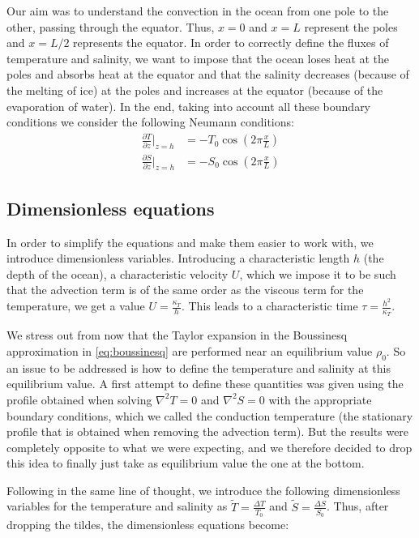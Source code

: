 \documentclass{article}
\begin{document}
Our aim was to understand the convection in the ocean from one pole to the other, passing through the equator. Thus, $x=0$ and $x=L$ represent the poles and $x=L/2$ represents the equator.
In order to correctly define the fluxes of temperature and salinity, we want to impose that the ocean loses heat at the poles and absorbs heat at the equator and that the salinity decreases (because of the melting of ice) at the poles and increases at the equator (because of the evaporation of water). In the end, taking into account all these boundary conditions we consider the following Neumann conditions:
\begin{equation}
  \begin{aligned}
    \frac{\partial T}{\partial z}\bigg|_{z = h} & = -T_0\cos(2\pi \frac{x}{L}) \\
    \frac{\partial S}{\partial z}\bigg|_{z = h} & = -S_0\cos(2\pi \frac{x}{L})
  \end{aligned}
\end{equation}


\subsection{Dimensionless equations}
In order to simplify the equations and make them easier to work with, we introduce dimensionless variables. Introducing a characteristic length $h$ (the depth of the ocean), a characteristic velocity $U$, which we impose it to be such that the advection term is of the same order as the viscous term for the temperature, we get a value $U=\frac{\kappa_T}{h}$. This leads to a characteristic time $\tau = \frac{h^2}{\kappa_T}$.

We stress out from now that the Taylor expansion in the Boussinesq approximation in \cref{eq:boussinesq} are performed near an equilibrium value $\rho_0$. So an issue to be addressed is how to define the temperature and salinity at this equilibrium value. A first attempt to define these quantities was given using the profile obtained when solving $\nabla^2T = 0$ and $\nabla^2S=0$ with the appropriate boundary conditions, which we called the conduction temperature (the stationary profile that is obtained when removing the advection term). But the results were completely opposite to what we were expecting, and we therefore decided to drop this idea to finally just take as equilibrium value the one at the bottom.

Following in the same line of thought, we introduce the following dimensionless variables for the temperature and salinity as $\tilde{T} = \frac{\Delta T}{T_0}$ and $\tilde{S} = \frac{\Delta S}{S_0}$. Thus, after dropping the tildes, the dimensionless equations become:
\end{document}
